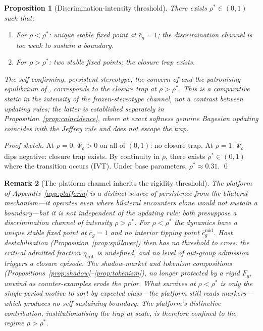 \documentclass[pdflatex,sn-basic]{sn-jnl}
\theoremstyle{thmstyleone}
\newtheorem{proposition}{Proposition}
\newtheorem{remark}[proposition]{Remark}
\numberwithin{proposition}{subsection}
\begin{document}
\begin{proposition}[Discrimination-intensity threshold]
\label{prop:loury-nesting}
There exists $\rho^* \in (0,1)$ such that:
\begin{enumerate}[noitemsep]
  \item For $\rho < \rho^*$: unique stable fixed point at
  $\bar{c}_g = 1$; the discrimination channel is too weak to sustain a
  boundary.
  \item For $\rho > \rho^*$: two stable fixed points; the closure trap
  exists.
\end{enumerate}
The self-confirming, persistent stereotype, the concern of
\citet{Loury2002} and the patronising equilibrium of
\citet{CoateLoury1993}, corresponds to the closure trap at
$\rho > \rho^*$. This is a comparative static in the intensity of the
frozen-stereotype channel, not a contrast between updating rules; the
latter is established separately in Proposition~\ref{prop:coincidence},
where at exact softness genuine Bayesian updating coincides with the
Jeffrey rule and does not escape the trap.
\end{proposition}

\begin{proof}[Proof sketch]
At $\rho = 0$, $\Psi_\rho > 0$ on all of $(0,1)$: no closure trap.
At $\rho = 1$, $\Psi_\rho$ dips negative: closure trap exists. By
continuity in $\rho$, there exists $\rho^* \in (0,1)$ where the
transition occurs (IVT). Under base parameters, $\rho^* \approx 0.31$.
\qed
\end{proof}

\begin{remark}[The platform channel inherits the rigidity threshold]
\label{rem:platform-bayes}
The platform of Appendix~\ref{app:platform} is a \emph{distinct} source
of persistence from the bilateral mechanism---it operates even where
bilateral encounters alone would not sustain a boundary---but it is not
independent of the \emph{updating rule}: both presuppose a discrimination
channel of intensity $\rho > \rho^*$. For $\rho < \rho^*$ the dynamics
have a unique stable fixed point at $\bar{c}_g = 1$ and no interior tipping
point $\bar{c}_g^{\mathrm{mid}}$. Host destabilisation
(Proposition~\ref{prop:spillover}) then has no threshold to cross: the
critical admitted fraction $\eta_{\mathrm{crit}}$ is undefined, and no
level of out-group admission triggers a closure episode. The
shadow-market and tokenism compositions
(Propositions~\ref{prop:shadow}--\ref{prop:tokenism}), no longer
protected by a rigid $F_{g}$, unwind as counter-examples erode the
prior. What survives at $\rho < \rho^*$ is only the single-period motive
to sort by expected class---the platform still reads markers---which
produces no self-sustaining boundary. The platform's distinctive
contribution, institutionalising the trap at scale, is therefore
confined to the regime $\rho > \rho^*$.
\end{remark}
\end{document}

